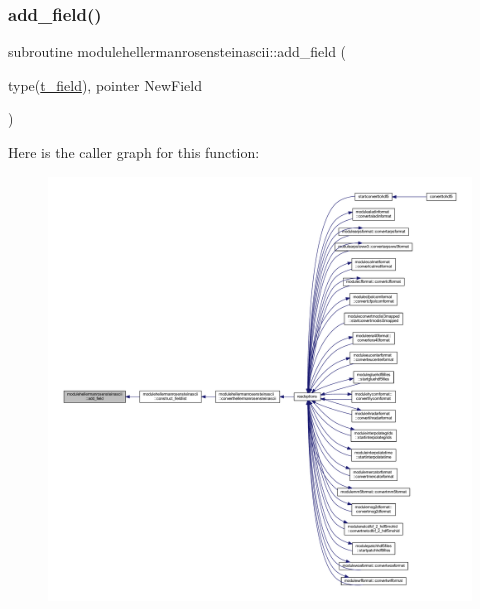 \subsubsection{\texorpdfstring{add\+\_\+field()}{add\_field()}}
{\footnotesize\ttfamily subroutine modulehellermanrosensteinascii\+::add\+\_\+field (\begin{DoxyParamCaption}\item[{type(\mbox{\hyperlink{structmodulehellermanrosensteinascii_1_1t__field}{t\+\_\+field}}), pointer}]{New\+Field }\end{DoxyParamCaption})\hspace{0.3cm}{\ttfamily [private]}}

Here is the caller graph for this function\+:\nopagebreak
\begin{figure}[H]
\begin{center}
\leavevmode
\includegraphics[width=350pt]{namespacemodulehellermanrosensteinascii_a39c581f7647526ad3d09ea87b66e024a_icgraph}
\end{center}
\end{figure}
\mbox{\label{namespacemodulehellermanrosensteinascii_a0456421b402f98f76f0ff495f712916f}} 
